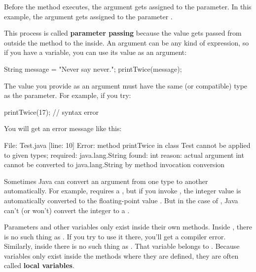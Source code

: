 
Before the method executes, the argument gets assigned to the parameter.
In this example, the argument  gets assigned to the parameter .


This process is called {\bf parameter passing} because the value gets passed from outside the method to the inside.
An argument can be any kind of expression, so if you have a  variable, you can use its value as an argument:

\begin{code}
String message = "Never say never.";
printTwice(message);
\end{code}

The value you provide as an argument must have the same (or compatible) type as the parameter.
For example, if you try:

\begin{code}
printTwice(17);  // syntax error
\end{code}

You will get an error message like this:

\begin{stdout}
File: Test.java  [line: 10]
Error: method printTwice in class Test cannot be applied
       to given types;
  required: java.lang.String
  found: int
  reason: actual argument int cannot be converted to
          java.lang.String by method invocation conversion
\end{stdout}

Sometimes Java can convert an argument from one type to another automatically.
For example,  requires a , but if you invoke , the integer value  is automatically converted to the floating-point value .
But in the case of , Java can't (or won't) convert the integer  to a .


Parameters and other variables only exist inside their own methods.
Inside , there is no such thing as .
If you try to use it there, you'll get a compiler error.
Similarly, inside  there is no such thing as .
That variable belongs to .
Because variables only exist inside the methods where they are defined, they are often called {\bf local variables}.

